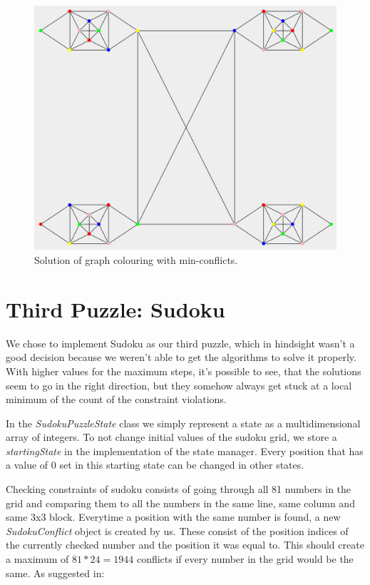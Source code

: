 \documentclass{scrartcl}
\begin{document}
  \begin{figure}[!htbp]
 \includegraphics[width=1.0\linewidth]{graphics/graph-mc.png}
\caption{Solution of graph colouring with min-conflicts.}\label{fig:graph-mc}
 \end{figure}

\pagebreak

\section{Third Puzzle: Sudoku}

We chose to implement Sudoku as our third puzzle, which in hindsight wasn't a good decision because we weren't able to get the algorithms to solve it properly. With higher values for the maximum steps, it's possible to see, that the solutions seem to go in the right direction, but they somehow always get stuck at a local minimum of the count of the constraint violations.

In the \textit{SudokuPuzzleState} class we simply represent a state as a multidimensional array of integers. To not change initial values of the sudoku grid, we store a \textit{startingState} in the implementation of the state manager. Every position that has a value of 0 set in this starting state can be changed in other states.

Checking constraints of sudoku consists of going through all 81 numbers in the grid and comparing them to all the numbers in the same line, same column and same 3x3 block. Everytime a position with the same number is found, a new \textit{SudokuConflict} object is created by us. These consist of the position indices of the currently checked number and the position it was equal to. This should create a maximum of $81*24=1944$ conflicts if every number in the grid would be the same. As suggested in:
\end{document}
